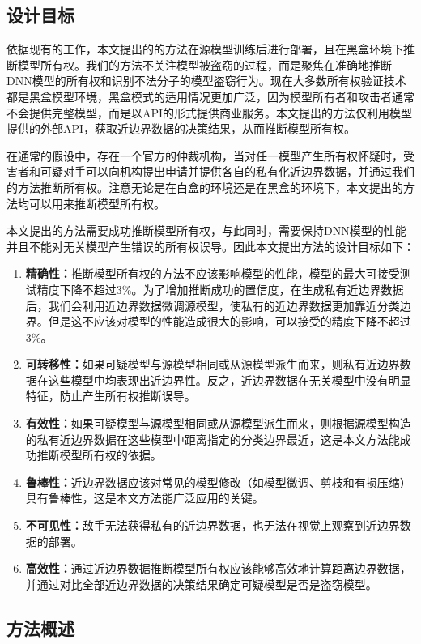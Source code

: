 \subsection{设计目标}

依据现有的工作，本文提出的的方法在源模型训练后进行部署，且在黑盒环境下推断模型所有权。我们的方法不关注模型被盗窃的过程，而是聚焦在准确地推断DNN模型的所有权和识别不法分子的模型盗窃行为。现在大多数所有权验证技术都是黑盒模型环境，黑盒模式的适用情况更加广泛，因为模型所有者和攻击者通常不会提供完整模型，而是以API的形式提供商业服务。本文提出的方法仅利用模型提供的外部API，获取近边界数据的决策结果，从而推断模型所有权。

在通常的假设中，存在一个官方的仲裁机构，当对任一模型产生所有权怀疑时，受害者和可疑对手可以向机构提出申请并提供各自的私有化近边界数据，并通过我们的方法推断所有权。注意无论是在白盒的环境还是在黑盒的环境下，本文提出的方法均可以用来推断模型所有权。

本文提出的方法需要成功推断模型所有权，与此同时，需要保持DNN模型的性能并且不能对无关模型产生错误的所有权误导。因此本文提出方法的设计目标如下：
\begin{enumerate}
	\renewcommand{\labelenumi}{\theenumi)}
	\item \textbf{精确性：}推断模型所有权的方法不应该影响模型的性能，模型的最大可接受测试精度下降不超过3\%。为了增加推断成功的置信度，在生成私有近边界数据后，我们会利用近边界数据微调源模型，使私有的近边界数据更加靠近分类边界。但是这不应该对模型的性能造成很大的影响，可以接受的精度下降不超过3\%。
	\item \textbf{可转移性：}如果可疑模型与源模型相同或从源模型派生而来，则私有近边界数据在这些模型中均表现出近边界性。反之，近边界数据在无关模型中没有明显特征，防止产生所有权推断误导。
	\item \textbf{有效性：}如果可疑模型与源模型相同或从源模型派生而来，则根据源模型构造的私有近边界数据在这些模型中距离指定的分类边界最近，这是本文方法能成功推断模型所有权的依据。
	\item \textbf{鲁棒性：}近边界数据应该对常见的模型修改（如模型微调、剪枝和有损压缩）具有鲁棒性，这是本文方法能广泛应用的关键。
	\item \textbf{不可见性：}敌手无法获得私有的近边界数据，也无法在视觉上观察到近边界数据的部署。
	\item \textbf{高效性：}通过近边界数据推断模型所有权应该能够高效地计算距离边界数据，并通过对比全部近边界数据的决策结果确定可疑模型是否是盗窃模型。
\end{enumerate}

\subsection{方法概述}

